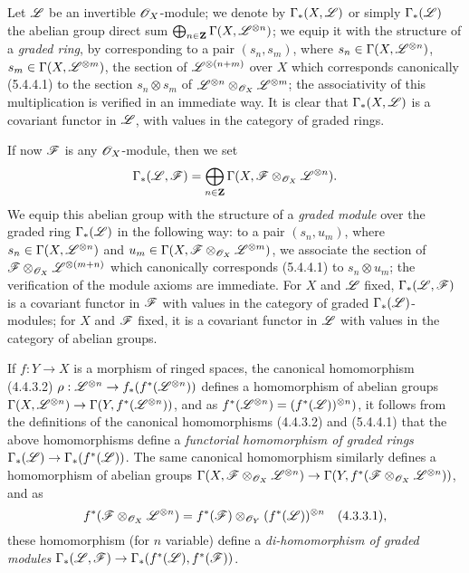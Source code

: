 \begin{env}[5.4.6]
\label{0.5.4.6}
Let $\mathscr{L}$ be an invertible $\mathscr{O}_X$-module; we denote by $\Gamma_*(X,\mathscr{L})$ or simply $\Gamma_*(\mathscr{L})$ the abelian group direct sum $\bigoplus_{n\in\mathbf{Z}}\Gamma(X,\mathscr{L}^{\otimes n})$;
we equip it with the structure of a \emph{graded ring}, by corresponding to a pair $(s_n,s_m)$, where $s_n\in\Gamma(X,\mathscr{L}^{\otimes n})$, $s_m\in\Gamma(X,\mathscr{L}^{\otimes m})$, the section of $\mathscr{L}^{\otimes(n+m)}$ over $X$ which corresponds canonically (5.4.4.1) to the section $s_n\otimes s_m$ of $\mathscr{L}^{\otimes n}\otimes_{\mathscr{O}_X}\mathscr{L}^{\otimes m}$;
the associativity of this multiplication is verified in an immediate way.
It is clear that $\Gamma_*(X,\mathscr{L})$ is a covariant functor in $\mathscr{L}$, with values in the category of graded rings.

If now $\mathscr{F}$ is any $\mathscr{O}_X$-module, then we set
\[
  \Gamma_*(\mathscr{L},\mathscr{F})=\bigoplus_{n\in\mathbf{Z}}\Gamma(X,\mathscr{F}\otimes_{\mathscr{O}_X}\mathscr{L}^{\otimes n}).
\]
We equip this abelian group with the structure of a \emph{graded module} over the graded ring $\Gamma_*(\mathscr{L})$ in the following way:
to a pair $(s_n,u_m)$, where $s_n\in\Gamma(X,\mathscr{L}^{\otimes n})$ and $u_m\in\Gamma(X,\mathscr{F}\otimes_{\mathscr{O}_X}\mathscr{L}^{\otimes m})$, we associate the section of $\mathscr{F}\otimes_{\mathscr{O}_X}\mathscr{L}^{\otimes(m+n)}$ which canonically corresponds (5.4.4.1) to $s_n\otimes u_m$;
the verification of the module axioms are immediate.
For $X$ and $\mathscr{L}$ fixed, $\Gamma_*(\mathscr{L},\mathscr{F})$ is a covariant functor in $\mathscr{F}$ with values in the category of graded $\Gamma_*(\mathscr{L})$-modules;
for $X$ and $\mathscr{F}$ fixed, it is a covariant functor in $\mathscr{L}$ with values in the category of abelian groups.

If $f:Y\to X$ is a morphism of ringed spaces, the canonical homomorphism (4.4.3.2) $\rho:\sh{L}^{\otimes n}\to f_*(f^*(\sh{L}^{\otimes n}))$ defines a homomorphism of abelian groups $\Gamma(X,\sh{L}^{\otimes n})\to\Gamma(Y,f^*(\sh{L}^{\otimes n}))$, and as $f^*(\mathscr{L}^{\otimes n})=(f^*(\mathscr{L}))^{\otimes n})$, it follows from the definitions of the canonical homomorphisms (4.4.3.2) and (5.4.4.1) that the above homomorphisms define a \emph{functorial homomorphism of graded rings $\Gamma_*(\sh{L})\to\Gamma_*(f^*(\sh{L}))$}.
The same canonical homomorphism  similarly defines a homomorphism of abelian groups $\Gamma(X,\sh{F}\otimes_{\sh{O}_X}\sh{L}^{\otimes n})\to\Gamma(Y,f^*(\sh{F}\otimes_{\sh{O}_X}\sh{L}^{\otimes n}))$, and as
\[
  f^*(\mathscr{F}\otimes_{\mathscr{O}_X}\mathscr{L}^{\otimes n})=f^*(\mathscr{F})\otimes_{\mathscr{O}_Y}(f^*(\mathscr{L}))^{\otimes n}
  \quad(4.3.3.1),
\]
these homomorphism (for $n$ variable) define a \emph{di-homomorphism of graded modules $\Gamma_*(\sh{L},\sh{F})\to\Gamma_*(f^*(\sh{L}),f^*(\sh{F}))$}.
\end{env}

